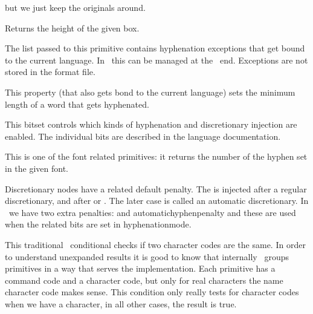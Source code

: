 \permanent\protected\untraced\def\hss
  {\hskip\hssglue}
\stoptyping

but we just keep the originals around.

\stopoldprimitive

\startoldprimitive[title={\prm {ht}}]

Returns the height of the given box.

\stopoldprimitive

\startoldprimitive[title={\prm {hyphenation}}]

The list passed to this primitive contains hyphenation exceptions that get bound
to the current language. In \LUAMETATEX\ this can be managed at the \LUA\ end.
Exceptions are not stored in the format file.

\stopoldprimitive

\startnewprimitive[title={\prm {hyphenationmin}}]

This property (that also gets bond to the current language) sets the minimum
length of a word that gets hyphenated.

\stopnewprimitive

\startnewprimitive[title={\prm {hyphenationmode}}]

This bitset controls which kinds of hyphenation and discretionary injection are
enabled. The individual bits are described in the language documentation.

\stopnewprimitive

\startoldprimitive[title={\prm {hyphenchar}}]

This is one of the font related primitives: it returns the number of the hyphen
set in the given font.

\stopoldprimitive

\startoldprimitive[title={\prm {hyphenpenalty}}]

Discretionary nodes have a related default penalty. The  is
injected after a regular discretionary, and  after \type
{\-} or \type {-}. The later case is called an automatic discretionary. In
\LUAMETATEX\ we have two extra penalties:  and \prm
{automatichyphenpenalty} and these are used when the related bits are set in \prm
{hyphenationmode}.

\stopoldprimitive

\startoldprimitive[title={\prm {if}}]

This traditional \TEX\ conditional checks if two character codes are the same. In
order to understand unexpanded results it is good to know that internally \TEX\
groups primitives in a way that serves the implementation. Each primitive has a
command code and a character code, but only for real characters the name
character code makes sense. This condition only really tests for character codes
when we have a character, in all other cases, the result is true.

